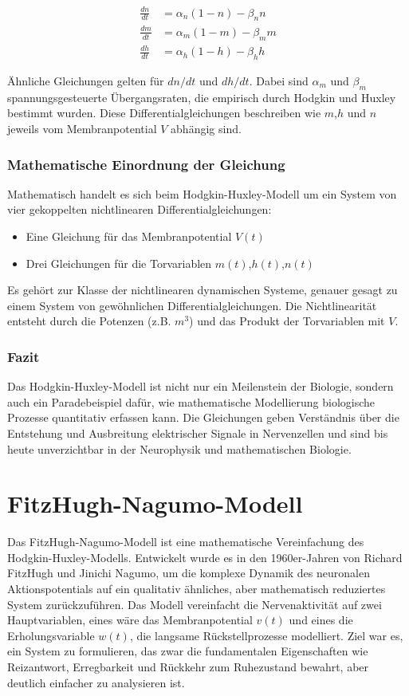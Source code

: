 \begin{refsection}
\begin{align}
	\frac{dn}{dt} &= \alpha_n (1 - n) - \beta_n n \\
	\frac{dm}{dt} &= \alpha_m (1 - m) - \beta_m m \\
	\frac{dh}{dt} &= \alpha_h (1 - h) - \beta_h h 
\end{align}

Ähnliche Gleichungen gelten für $dn/dt$ und $dh/dt$. Dabei sind $\alpha_m$ und $\beta_m$ spannungsgesteuerte Übergangsraten, die empirisch durch Hodgkin und Huxley bestimmt wurden.
Diese Differentialgleichungen beschreiben wie $m$,$h$ und $n$ jeweils vom Membranpotential $V$ abhängig sind.
\subsubsection{Mathematische Einordnung der Gleichung}
Mathematisch handelt es sich beim Hodgkin-Huxley-Modell um ein System von vier gekoppelten nichtlinearen
Differentialgleichungen:
\begin{itemize}
    \item Eine Gleichung für das Membranpotential $V(t)$
    \item Drei Gleichungen für die Torvariablen $m(t)$,$h(t)$,$n(t)$
\end{itemize}

Es gehört zur Klasse der nichtlinearen dynamischen Systeme, genauer gesagt zu einem System von gewöhnlichen Differentialgleichungen. Die Nichtlinearität entsteht durch die Potenzen (z.B. $m^3$) und das Produkt der Torvariablen mit $V$.
\subsubsection{Fazit}
Das Hodgkin-Huxley-Modell ist nicht nur ein Meilenstein der Biologie, sondern auch ein Paradebeispiel dafür, wie mathematische Modellierung biologische Prozesse quantitativ erfassen kann. Die Gleichungen geben Verständnis über die Entstehung und Ausbreitung elektrischer Signale in Nervenzellen und sind bis heute unverzichtbar in der Neurophysik und mathematischen Biologie.

\section{FitzHugh-Nagumo-Modell}
Das FitzHugh-Nagumo-Modell ist eine mathematische Vereinfachung des Hodgkin-Huxley-Modells. Entwickelt wurde es in den 1960er-Jahren von Richard FitzHugh und Jinichi Nagumo, um die komplexe Dynamik des neuronalen Aktionspotentials auf ein qualitativ ähnliches, aber mathematisch reduziertes System zurückzuführen.
Das Modell vereinfacht die Nervenaktivität auf zwei Hauptvariablen, eines wäre das Membranpotential $v(t)$ und eines die Erholungsvariable $w(t)$, die langsame Rückstellprozesse modelliert.
Ziel war es, ein System zu formulieren, das zwar die fundamentalen Eigenschaften wie Reizantwort, Erregbarkeit und Rückkehr zum Ruhezustand bewahrt, aber deutlich einfacher zu analysieren ist. 


\end{refsection}
